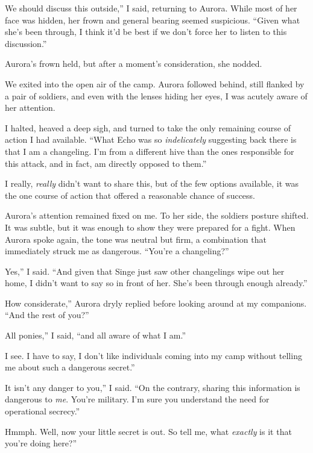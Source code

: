 \leavevmode{}We should discuss this outside,” I said, returning to Aurora. While most of her face was hidden, her frown and general bearing seemed suspicious. “Given what she’s been through, I think it’d be best if we don’t force her to listen to this discussion.”

Aurora’s frown held, but after a moment’s consideration, she nodded.

We exited into the open air of the camp. Aurora followed behind, still flanked by a pair of soldiers, and even with the lenses hiding her eyes, I was acutely aware of her attention.

I halted, heaved a deep sigh, and turned to take the only remaining course of action I had available. “What Echo was so \textit{indelicately} suggesting back there is that I am a changeling. I’m from a different hive than the ones responsible for this attack, and in fact, am directly opposed to them.”

I really, \textit{really} didn’t want to share this, but of the few options available, it was the one course of action that offered a reasonable chance of success.

Aurora’s attention remained fixed on me. To her side, the soldiers posture shifted. It was subtle, but it was enough to show they were prepared for a fight. When Aurora spoke again, the tone was neutral but firm, a combination that immediately struck me as dangerous. “You’re a changeling?”

\leavevmode{}Yes,” I said. “And given that Singe just saw other changelings wipe out her home, I didn’t want to say so in front of her. She’s been through enough already.”

\leavevmode{}How considerate,” Aurora dryly replied before looking around at my companions. “And the rest of you?”

\leavevmode{}All ponies,” I said, “and all aware of what I am.”

\leavevmode{}I see. I have to say, I don’t like individuals coming into my camp without telling me about such a dangerous secret.”

\leavevmode{}It isn’t any danger to you,” I said. “On the contrary, sharing this information is dangerous to \textit{me}. You’re military. I’m sure you understand the need for operational secrecy.”

\leavevmode{}Hmmph. Well, now your little secret is out. So tell me, what \textit{exactly} is it that you’re doing here?”

